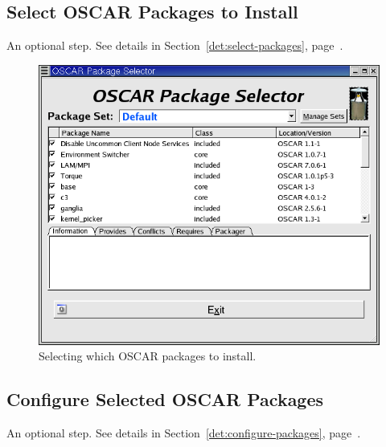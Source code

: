 
\subsection{Select OSCAR Packages to Install}

An optional step.  See details in Section~\ref{det:select-packages},
page~\pageref{det:select-packages}.

\begin{figure}[ht!]
  \begin{center}
    \centerline{\includegraphics[scale=\imgscale]{figs/package-selection}}
    \caption[Selecting which OSCAR packages to install.]{Selecting
      which OSCAR packages to install.}  
    \label{fig:sbs-package-selection}
  \end{center}
\end{figure}


\subsection{Configure Selected OSCAR Packages}

An optional step.  See details in
Section~\ref{det:configure-packages},
page~\pageref{det:configure-packages}.

